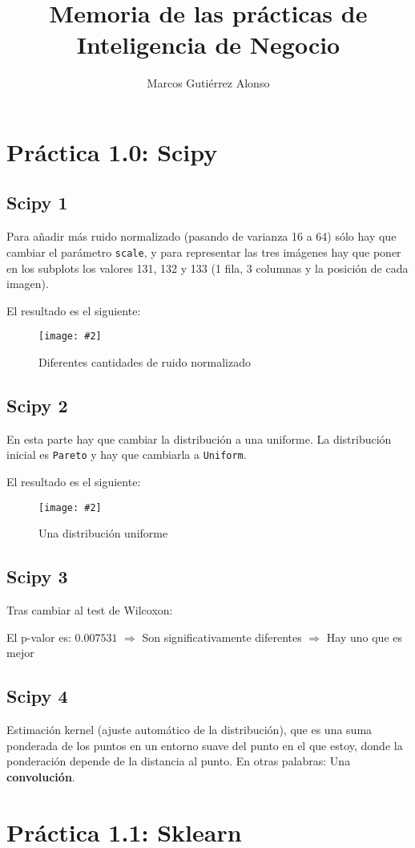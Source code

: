 \documentclass[
12pt, 
spanish, 
singlespacing,
headsepline
]{article}
\author{Marcos Gutiérrez Alonso}
\title{Memoria de las prácticas de Inteligencia de Negocio}
\newcommand{\image}[2]{
\begin{figure}[H]
	\caption{#1}
	\centering
	\texttt{[image: \#2]}
\end{figure}
}
\begin{document}
\begin{titlepage}
	\maketitle
	\tableofcontents
\end{titlepage}

\section{Práctica 1.0: Scipy}
\subsection{Scipy 1}
Para añadir más ruido normalizado (pasando de varianza 16 a 64) sólo hay que cambiar el parámetro \texttt{scale}, y para representar las tres imágenes hay que poner en los subplots los valores 131, 132 y 133 (1 fila, 3 columnas y la posición de cada imagen).

El resultado es el siguiente:
\image{Diferentes cantidades de ruido normalizado}{Figure\_1.png}

\subsection{Scipy 2}
En esta parte hay que cambiar la distribución a una uniforme.
La distribución inicial es \texttt{Pareto} y hay que cambiarla a \texttt{Uniform}.

El resultado es el siguiente:
\image{Una distribución uniforme}{Figure_2.png}

\subsection{Scipy 3}
Tras cambiar al test de Wilcoxon: 

El p-valor es: $0.007531$ $\Rightarrow$ Son significativamente diferentes $\Rightarrow$ Hay uno que es mejor

\subsection{Scipy 4}
Estimación kernel (ajuste automático de la distribución), que es una suma ponderada de los puntos en un entorno suave del punto en el que estoy, donde la ponderación depende de la distancia al punto. En otras palabras: Una \textbf{convolución}.

\section{Práctica 1.1: Sklearn}
\end{document}
